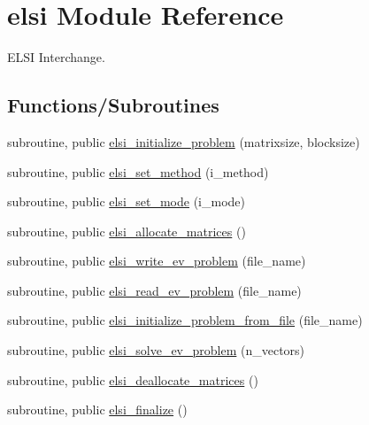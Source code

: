 \hypertarget{namespaceelsi}{}\section{elsi Module Reference}
\label{namespaceelsi}


E\+L\+S\+I Interchange.  


\subsection*{Functions/\+Subroutines}
\begin{DoxyCompactItemize}
\item 
subroutine, public \hyperlink{namespaceelsi_a2d0ffe2765b86bc3ea833e228069038b}{elsi\+\_\+initialize\+\_\+problem} (matrixsize, blocksize)
\item 
subroutine, public \hyperlink{namespaceelsi_a783f376d4233c7ddd34506025e9da783}{elsi\+\_\+set\+\_\+method} (i\+\_\+method)
\item 
subroutine, public \hyperlink{namespaceelsi_aae6ed67fce5603d05ec7c9a12e1d2f5e}{elsi\+\_\+set\+\_\+mode} (i\+\_\+mode)
\item 
subroutine, public \hyperlink{namespaceelsi_a52d5a0efd881b80fa249a8f07b90249f}{elsi\+\_\+allocate\+\_\+matrices} ()
\item 
subroutine, public \hyperlink{namespaceelsi_acfc3cef5687edefbba8170aa3c957c0f}{elsi\+\_\+write\+\_\+ev\+\_\+problem} (file\+\_\+name)
\item 
subroutine, public \hyperlink{namespaceelsi_a05effde2e85df40e63ba3ff519dc457b}{elsi\+\_\+read\+\_\+ev\+\_\+problem} (file\+\_\+name)
\item 
subroutine, public \hyperlink{namespaceelsi_a8d4e07912d425d778af75fee646a724f}{elsi\+\_\+initialize\+\_\+problem\+\_\+from\+\_\+file} (file\+\_\+name)
\item 
subroutine, public \hyperlink{namespaceelsi_af3291953e595197b4c492d176859d83d}{elsi\+\_\+solve\+\_\+ev\+\_\+problem} (n\+\_\+vectors)
\item 
subroutine, public \hyperlink{namespaceelsi_a499852f3083dae7991092915ef2dc5b2}{elsi\+\_\+deallocate\+\_\+matrices} ()
\item 
subroutine, public \hyperlink{namespaceelsi_aa635e42ca93ef9def165bccd1647031e}{elsi\+\_\+finalize} ()
\end{DoxyCompactItemize}
